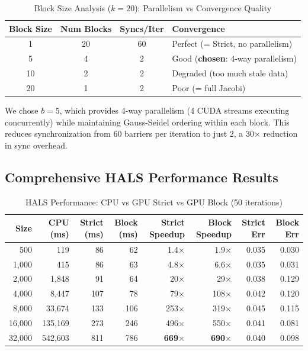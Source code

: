 \documentclass[11pt]{article}
\begin{document}
\begin{table}[h]
\centering
\caption{Block Size Analysis ($k=20$): Parallelism vs Convergence Quality}
\begin{tabular}{@{}cccl@{}}
\toprule
Block Size & Num Blocks & Syncs/Iter & Convergence \\ \midrule
1 & 20 & 60 & Perfect (= Strict, no parallelism) \\
5 & 4 & 2 & Good (\textbf{chosen}: 4-way parallelism) \\
10 & 2 & 2 & Degraded (too much stale data) \\
20 & 1 & 2 & Poor (= full Jacobi) \\ \bottomrule
\end{tabular}
\end{table}

We chose $b=5$, which provides 4-way parallelism (4 CUDA streams executing concurrently) while maintaining Gauss-Seidel ordering within each block. This reduces synchronization from 60 barriers per iteration to just 2, a 30$\times$ reduction in sync overhead.

\subsection{Comprehensive HALS Performance Results}

\begin{table}[h]
\centering
\caption{HALS Performance: CPU vs GPU Strict vs GPU Block (50 iterations)}
\label{tab:hals_full}
\begin{tabular}{@{}rrrrrrrr@{}}
\toprule
Size & CPU (ms) & Strict (ms) & Block (ms) & Strict Speedup & Block Speedup & Strict Err & Block Err \\ \midrule
500 & 119 & 86 & 62 & 1.4$\times$ & 1.9$\times$ & 0.035 & 0.030 \\
1,000 & 415 & 86 & 63 & 4.8$\times$ & 6.6$\times$ & 0.035 & 0.031 \\
2,000 & 1,848 & 91 & 64 & 20$\times$ & 29$\times$ & 0.038 & 0.129 \\
4,000 & 8,447 & 107 & 78 & 79$\times$ & 108$\times$ & 0.042 & 0.120 \\
8,000 & 33,674 & 133 & 106 & 253$\times$ & 319$\times$ & 0.045 & 0.115 \\
16,000 & 135,169 & 273 & 246 & 496$\times$ & 550$\times$ & 0.041 & 0.081 \\
32,000 & 542,603 & 811 & 786 & \textbf{669$\times$} & \textbf{690$\times$} & 0.040 & 0.098 \\ \bottomrule
\end{tabular}
\end{table}
\end{document}
